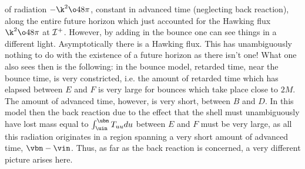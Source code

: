 of radiation $-{\k^2\o48\pi}$, constant in advanced time (neglecting
back reaction), along the entire future horizon which just accounted
for the Hawking flux ${\k^2\o48\pi}$ at ${\cal I}^+$.  However, by
adding in the bounce one can see things in a different light.
Asymptotically there is a Hawking flux. This has unambiguously nothing
to do with the existence of a future horizon as there isn't one! What
one also sees then is the following: in the bounce model, retarded
time, near the bounce time, is very constricted, i.e. the amount of
retarded time which has elapsed between $E$ and $F$ is very large for
bounces which take place close to $2M$. The amount of advanced time,
however, is very short, between $B$ and $D$. In this model then the
back reaction due to the effect that the shell must unambiguously have
lost mass equal to $\int^{\ubn}_{\uin}T_{uu}du$ between $E$ and $F$
must be very large, as all this radiation originates in a region
spanning a very short amount of advanced time, $\vbn-\vin$.  Thus, as
far as the back reaction is concerned, a very different picture arises
here.

